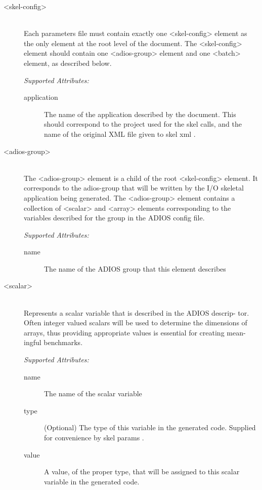 \begin{description}
  \item[<skel-config>] \hfill \\
Each parameters file must contain exactly one
<skel-config> element as the only element at the root level of the document. The
<skel-config> element should contain one <adios-group> element and one <batch>
element, as described below.

{\it Supported Attributes:}
  \begin{description}
    \item[application]
The name of the application described by the document.
This should correspond to the project used for the skel calls, and
the name of the original XML file given to skel xml .
  \end{description}


  \item[<adios-group>] \hfill \\
The <adios-group> element is a child of the root <skel-config>
element. It corresponds to the adios-group that will be written by the I/O
skeletal application being generated. The <adios-group> element contains a collection of
<scalar> and <array> elements corresponding to the variables described for the group
in the ADIOS config file.

{\it Supported Attributes:}
  \begin{description}
    \item[name]
The name of the ADIOS group that this element describes
  \end{description}


  \item[<scalar>] \hfill \\
Represents a scalar variable that is described in the ADIOS descrip-
tor. Often integer valued scalars will be used to determine the dimensions
of arrays, thus providing appropriate values is essential for creating mean-
ingful benchmarks.

{\it Supported Attributes:}
  \begin{description}
    \item[name]
The name of the scalar variable
    \item[type]
(Optional) The type of this variable in the generated code. Supplied
for convenience by skel params .
    \item[value]
A value, of the proper type, that will be assigned to this scalar
variable in the generated code.
  \end{description}


\end{description}
